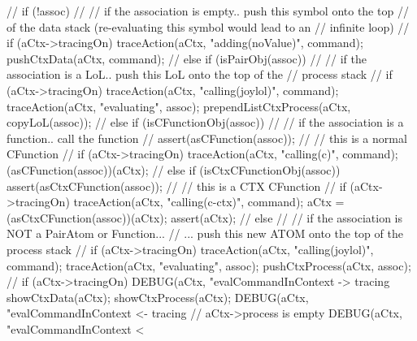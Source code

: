 {{{      //
      if (!assoc) {
        //
        // if the association is empty.. push this symbol onto the top
        // of the data stack (re-evaluating this symbol would lead to an
        // infinite loop)
        //
        if (aCtx->tracingOn)
          traceAction(aCtx, "adding(noValue)", command);
        pushCtxData(aCtx, command);
        //
      } else if (isPairObj(assoc)) {
        //
        // if the association is a LoL.. push this LoL onto the top of the
        // process stack
        //
        if (aCtx->tracingOn) {
          traceAction(aCtx, "calling(joylol)", command);
          traceAction(aCtx, "evaluating",      assoc);
        }
        prependListCtxProcess(aCtx, copyLoL(assoc));
        //
      } else if (isCFunctionObj(assoc)) {
        //
        // if the association is a function.. call the function
        //
        assert(asCFunction(assoc));
        //
        // this is a normal CFunction
        //
        if (aCtx->tracingOn)
          traceAction(aCtx, "calling(c)", command);
        (asCFunction(assoc))(aCtx);
        //
      } else if (isCtxCFunctionObj(assoc)) {
        assert(asCtxCFunction(assoc));
        //
        // this is a CTX CFunction
        //
        if (aCtx->tracingOn) 
          traceAction(aCtx, "calling(c-ctx)", command);
        aCtx = (asCtxCFunction(assoc))(aCtx);
        assert(aCtx);
        //
      } else {
        //
        // if the association is NOT a PairAtom or Function...
        // ... push this new ATOM onto the top of the process stack
        //
        if (aCtx->tracingOn) {
          traceAction(aCtx, "calling(joylol)", command);
          traceAction(aCtx, "evaluating",      assoc);
        }
        pushCtxProcess(aCtx, assoc);
        //
      }
    }
    if (aCtx->tracingOn) {
      DEBUG(aCtx, "evalCommandInContext -> tracing%
      showCtxData(aCtx);
      showCtxProcess(aCtx);
      DEBUG(aCtx, "evalCommandInContext <- tracing%
    }
  } // aCtx->process is empty
  DEBUG(aCtx, "evalCommandInContext < %
}

\stopCCode
